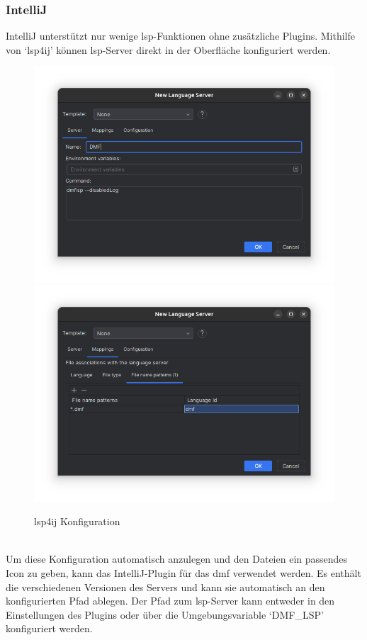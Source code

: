 \documentclass[./einleitung.tex]{subfiles}
\begin{document}
    \subsubsection{IntelliJ}
    IntelliJ unterstützt nur wenige \acrshort{lsp}-Funktionen ohne zusätzliche Plugins.
    Mithilfe von `lsp4ij' können \acrshort{lsp}-Server direkt in der Oberfläche konfiguriert werden.\\
    \begin{figure}[H]
        \includegraphics[width=\linewidth / 2]{bilder/screenshot-add-lsp-lsp4ij}
        \includegraphics[width=\linewidth / 2]{bilder/screenshot-file-mapping}
        \caption{lsp4ij Konfiguration}
        \label{fig:screenshot-add-lsp-lsp4ij}
    \end{figure}\\
    Um diese Konfiguration automatisch anzulegen und den Dateien ein passendes Icon zu geben, kann das IntelliJ-Plugin für das \acrshort{dmf} verwendet werden.
    Es enthält die verschiedenen Versionen des Servers und kann sie automatisch an den konfigurierten Pfad ablegen.
    Der Pfad zum \acrshort{lsp}-Server kann entweder in den Einstellungen des Plugins oder über die Umgebungsvariable `DMF\_LSP' konfiguriert werden.
\end{document}
